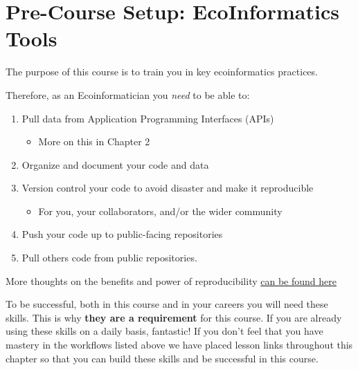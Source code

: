 \documentclass[
  letterpaper,
]{book}
\providecommand{\tightlist}{%
  \setlength{\itemsep}{0pt}\setlength{\parskip}{0pt}}
\begin{document}

\chapter*{Pre-Course Setup: EcoInformatics
Tools}\label{pre-course-setup-ecoinformatics-tools}


The purpose of this course is to train you in key ecoinformatics
practices.

Therefore, as an Ecoinformatician you \emph{need} to be able to:

\begin{enumerate}
\def\labelenumi{\arabic{enumi}.}
\item
  Pull data from Application Programming Interfaces (APIs)

  \begin{itemize}
  \tightlist
  \item
    More on this in Chapter 2
  \end{itemize}
\item
  Organize and document your code and data
\item
  Version control your code to avoid disaster and make it reproducible

  \begin{itemize}
  \tightlist
  \item
    For you, your collaborators, and/or the wider community
  \end{itemize}
\item
  Push your code up to public-facing repositories
\item
  Pull others code from public repositories.
\end{enumerate}

More thoughts on the benefits and power of reproducibility
\href{https://github.com/katharynduffy/ECOSS_reproducible_science}{can
be found here}

To be successful, both in this course and in your careers you will need
these skills. This is why \textbf{they are a requirement} for this
course. If you are already using these skills on a daily basis,
fantastic! If you don't feel that you have mastery in the workflows
listed above we have placed lesson links throughout this chapter so that
you can build these skills and be successful in this course.
\end{document}
